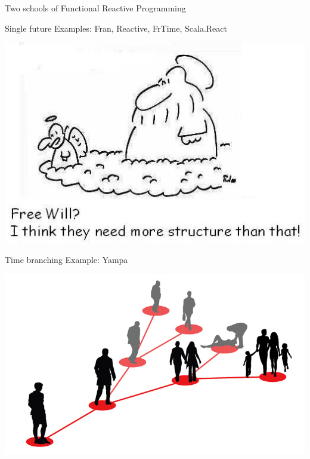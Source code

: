 \documentclass{beamer}
\begin{document}
\begin{frame}{Two schools of Functional Reactive Programming}

\begin{block}{Single future}
Examples: Fran, Reactive, FrTime, Scala.React \\
\vspace{-0.3cm}
\begin{center}
\includegraphics[scale=0.25]{free-will.jpg}
\end{center}
\vspace{-0.5cm}
\end{block}
\begin{block}{Time branching}
Example: Yampa
\vspace{-0.3cm}
\begin{center}
\includegraphics[scale=0.15]{many-worlds.png}
\end{center}
\vspace{-0.2cm}
\end{block}

\end{frame}
\end{document}

